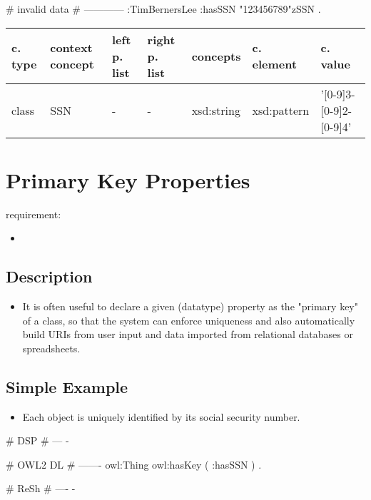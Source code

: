 \documentclass{llncs}
\newenvironment{gcotable}{
  \scriptsize
  \sffamily
  \vspace{0.3cm}
  \begin{tabular}{l|l|l|l|l|l|l}
  \hline
  \textbf{c. type} & \textbf{context concept} & \textbf{left p. list} & \textbf{right p. list} & \textbf{concepts} & \textbf{c. element} & \textbf{c. value} \\
  \hline

}{
  \hline
  \end{tabular}
  \linebreak
}
\begin{document}
\begin{ex}
# invalid data
# ------------
:TimBernersLee
    :hasSSN "123456789"^^:SSN .
\end{ex}

\begin{gcotable}
class & SSN & - & - & xsd:string & xsd:pattern & '[0-9]{3}-[0-9]{2}-[0-9]{4}' \\
\end{gcotable}

\section{Primary Key Properties}

requirement:

\begin{itemize}
	\item 
\end{itemize}

\subsection{Description}

\begin{itemize}
  \item It is often useful to declare a given (datatype) property as the "primary key" of a class, so that the system can enforce uniqueness and also automatically build URIs from user input and data imported from relational databases or spreadsheets. 
\end{itemize}

\subsection{Simple Example}

\begin{itemize}
	\item Each object is uniquely identified by its social security number.
\end{itemize}

\begin{ex}
# DSP
# ---
-
\end{ex}

\begin{ex}
# OWL2 DL
# -------
owl:Thing owl:hasKey ( :hasSSN ) . 	
\end{ex}

\begin{ex}
# ReSh
# ----
-
\end{ex}
\end{document}
